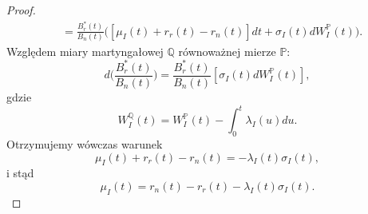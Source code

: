\documentclass{mini}
\theoremstyle{mythstyle}
\begin{document}
\begin{proof}
\begin{align*}
		&= \frac{B_r^*(t)}{B_n(t)} \bigg( [\mu_I(t) + r_r(t) - r_n(t)]dt + \sigma_I(t) dW_I^\mathbb{P}(t)\bigg).
		\end{align*}
		Względem miary martyngałowej $\mathbb{Q}$ równoważnej mierze $\mathbb{P}$:
		\begin{equation*}
		d\bigg(\frac{B_r^*(t)}{B_n(t)} \bigg) = \frac{B_r^*(t)}{B_n(t)} [\sigma_I(t) dW_I^\mathbb{P}(t)],
		\end{equation*}
		gdzie
		\begin{equation*}
		W_I^\mathbb{Q}(t) = W_I^\mathbb{P}(t) - \int_{0}^{t} \lambda_I(u) du.
		\end{equation*}
		Otrzymujemy wówczas warunek 
		\begin{equation}
		\mu_I(t) + r_r(t) - r_n(t) = -\lambda_I(t) \sigma_I(t),
		\end{equation}
		i stąd
		\begin{equation}
		\mu_I(t) =  r_n(t) - r_r(t) - \lambda_I(t) \sigma_I(t).
		\end{equation}
	

\end{proof}
\end{document}
